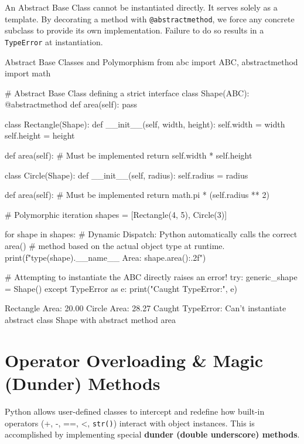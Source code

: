 An Abstract Base Class cannot be instantiated directly. It serves solely as a template. By decorating a method with \texttt{@abstractmethod}, we force any concrete subclass to provide its own implementation. Failure to do so results in a \texttt{TypeError} at instantiation.

\begin{pythoncode}{Abstract Base Classes and Polymorphism}
from abc import ABC, abstractmethod
import math

# Abstract Base Class defining a strict interface
class Shape(ABC):
    @abstractmethod
    def area(self):
        pass

class Rectangle(Shape):
    def __init__(self, width, height):
        self.width = width
        self.height = height
        
    def area(self): # Must be implemented
        return self.width * self.height

class Circle(Shape):
    def __init__(self, radius):
        self.radius = radius
        
    def area(self): # Must be implemented
        return math.pi * (self.radius ** 2)

# Polymorphic iteration
shapes = [Rectangle(4, 5), Circle(3)]

for shape in shapes:
    # Dynamic Dispatch: Python automatically calls the correct area() 
    # method based on the actual object type at runtime.
    print(f"{type(shape).__name__} Area: {shape.area():.2f}")

# Attempting to instantiate the ABC directly raises an error!
try:
    generic_shape = Shape()
except TypeError as e:
    print("Caught TypeError:", e)
\end{pythoncode}

\begin{outputbox}
Rectangle Area: 20.00
Circle Area: 28.27
Caught TypeError: Can't instantiate abstract class Shape with abstract method area
\end{outputbox}

\section{Operator Overloading \& Magic (Dunder) Methods}

Python allows user-defined classes to intercept and redefine how built-in operators (+, -, ==, <, \texttt{str()}) interact with object instances. This is accomplished by implementing special \textbf{dunder (double underscore) methods}.

